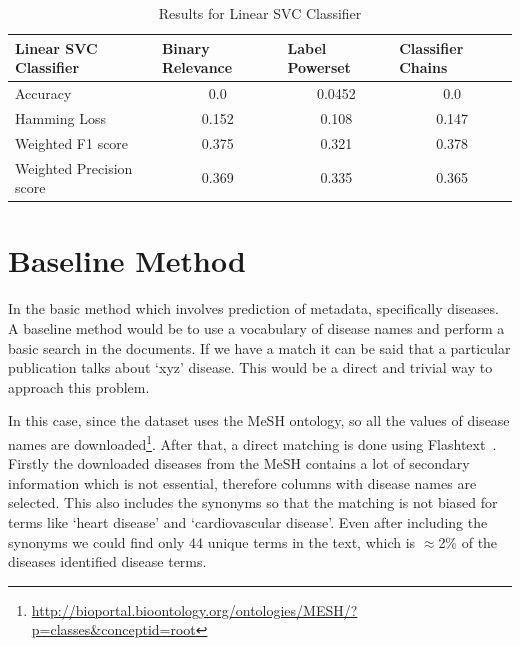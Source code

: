 \begin{table}[!htb]
    \centering
    \begin{tabular}{|l|c|c|c|}
\hline
Linear SVC Classifier    & \multicolumn{1}{l|}{Binary Relevance} & \multicolumn{1}{l|}{Label Powerset} & \multicolumn{1}{l|}{Classifier Chains} \\ \hline
Accuracy                 & 0.0                                   & 0.0452                              & 0.0                                    \\ \hline
Hamming Loss             & 0.152                                 & 0.108                               & 0.147                                  \\ \hline
Weighted F1 score        & 0.375                                 & 0.321                               & 0.378                                  \\ \hline
Weighted Precision score & 0.369                                 & 0.335                               & 0.365                                  \\ \hline
\end{tabular}
    \caption{Results for Linear SVC Classifier}
    \label{tab:linearsvc}
\end{table}


\section{Baseline Method}
In the basic method which involves prediction of metadata, specifically diseases. A baseline method would be to use a vocabulary of disease names and perform a basic search in the documents. If we have a match it can be said that a particular publication talks about `xyz' disease. This would be a direct and trivial way to approach this problem. 

In this case, since the dataset uses the MeSH ontology, so all the values of disease names are downloaded\footnote{\url{http://bioportal.bioontology.org/ontologies/MESH/?p=classes&conceptid=root}}. After that, a direct matching is done using Flashtext~\cite{2017arXiv171100046S}. Firstly the downloaded diseases from the MeSH contains a lot of secondary information which is not essential, therefore columns with disease names are selected. This also includes the synonyms so that the matching is not biased for terms like `heart disease' and `cardiovascular disease'. Even after including the synonyms we could find only $44$ unique terms in the text, which is $\approx$2\% of the diseases identified disease terms. 

